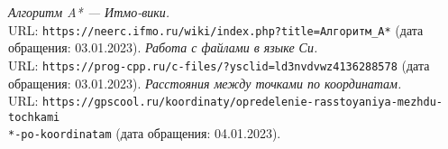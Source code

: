 \begin{thebibliography}{99}
{\itshape Алгоритм A* — Итмо-вики.} \\URL: \texttt{https://neerc.ifmo.ru/wiki/index.php?title=Алгоритм\_А*} (дата обращения: 03.01.2023).
{\itshape Работа с файлами в языке Си.} \\URL: 
\texttt{https://prog-cpp.ru/c-files/?ysclid=ld3nvdvwz4136288578} (дата обращения: 03.01.2023).
{\itshape Расстояния между точками по координатам.} \\URL: \texttt{https://gpscool.ru/koordinaty/opredelenie-rasstoyaniya-mezhdu-tochkami\\*-po-koordinatam} (дата обращения: 04.01.2023).
\end{thebibliography}
\pagebreak


